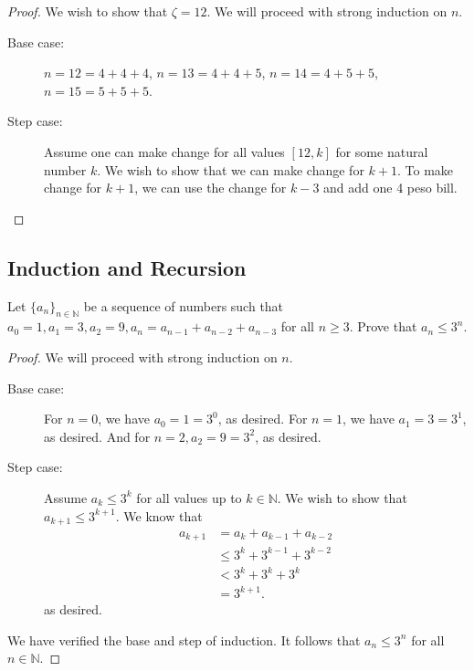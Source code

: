 \begin{proof}
	We wish to show that \( \zeta=12 \). We will proceed with strong induction on \( n \).
	\begin{description}
		\item[Base case:] \( n=12=4+4+4 \), \( n=13=4+4+5 \), \( n=14=4+5+5 \), \( n=15=5+5+5 \).
		\item[Step case:] Assume one can make change for all values \( [12, k] \) for some natural number \( k \). We wish to show that we can make change for \( k+1 \). To make change for \( k+1 \), we can use the change for \( k-3 \) and add one 4 peso bill.
	\end{description}
\end{proof}

\subsection{Induction and Recursion}

\begin{eg}
	Let \( \{a_n\}_{n \in \mathbb{N}} \) be a sequence of numbers such that \( a_{0}=1, a_{1}=3, a_{2}=9, a_n=a_{n-1} + a_{n-2} + a_{n-3}\) for all \( n \ge 3 \). Prove that \( a_n \le 3^n \).
\end{eg}

\begin{proof}
	We will proceed with strong induction on \( n \).
	\begin{description}
		\item[Base case:] For \( n=0 \), we have \( a_0=1=3^0 \), as desired. For \( n=1 \), we have \( a_1=3=3^1 \), as desired. And for \( n=2, a_2=9=3^2 \), as desired.
		\item[Step case:] Assume \( a_k \le 3^k \) for all values up to \( k \in \mathbb{N} \). We wish to show that \( a_{k+1}\le 3^{k+1}  \). We know that 
			\begin{align*}
				a_{k+1} &= a_k+a_{k-1}+a_{k-2} \\
								&\le 3^k + 3^{k-1} + 3^{k-2} \tag {Follows from inductive hypothesis} \\
								&< 3^k+3^k+3^k \\
								&= 3^{k+1}
			.\end{align*}
			as desired.
	\end{description}
	We have verified the base and step of induction. It follows that \( a_n \le 3^n \) for all \( n \in \mathbb{N} \).
\end{proof}
